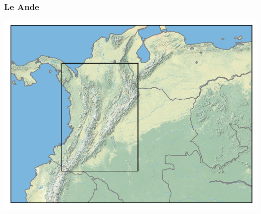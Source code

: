 \begin{frame} \frametitle{Le Ande} \centering \includegraphics[width=\textwidth,height=0.9\textheight,keepaspectratio]{regions_images/andes} \end{frame}


